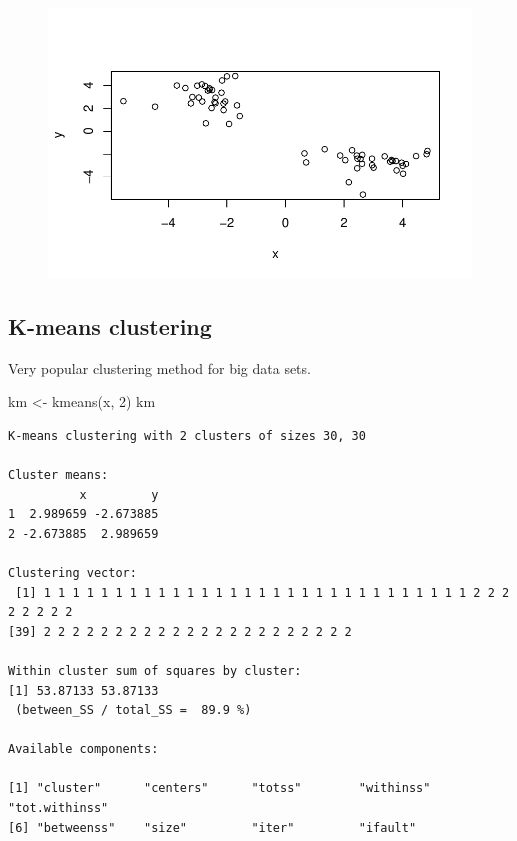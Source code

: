 \documentclass[
  letterpaper,
  DIV=11,
  numbers=noendperiod]{scrartcl}
\newenvironment{Shaded}{\begin{snugshade}}{\end{snugshade}}
\newcommand{\DecValTok}[1]{\textcolor[rgb]{0.68,0.00,0.00}{#1}}
\newcommand{\FunctionTok}[1]{\textcolor[rgb]{0.28,0.35,0.67}{#1}}
\newcommand{\NormalTok}[1]{\textcolor[rgb]{0.00,0.23,0.31}{#1}}
\newcommand{\OtherTok}[1]{\textcolor[rgb]{0.00,0.23,0.31}{#1}}
\begin{document}
\begin{figure}[H]

{\centering \includegraphics{Lab-7_files/figure-pdf/unnamed-chunk-4-1.pdf}

}

\end{figure}

\hypertarget{k-means-clustering}{%
\subsection{K-means clustering}\label{k-means-clustering}}

Very popular clustering method for big data sets.

\begin{Shaded}
\begin{Highlighting}[]
\NormalTok{km }\OtherTok{\textless{}{-}} \FunctionTok{kmeans}\NormalTok{(x, }\DecValTok{2}\NormalTok{)}
\NormalTok{km}
\end{Highlighting}
\end{Shaded}

\begin{verbatim}
K-means clustering with 2 clusters of sizes 30, 30

Cluster means:
          x         y
1  2.989659 -2.673885
2 -2.673885  2.989659

Clustering vector:
 [1] 1 1 1 1 1 1 1 1 1 1 1 1 1 1 1 1 1 1 1 1 1 1 1 1 1 1 1 1 1 1 2 2 2 2 2 2 2 2
[39] 2 2 2 2 2 2 2 2 2 2 2 2 2 2 2 2 2 2 2 2 2 2

Within cluster sum of squares by cluster:
[1] 53.87133 53.87133
 (between_SS / total_SS =  89.9 %)

Available components:

[1] "cluster"      "centers"      "totss"        "withinss"     "tot.withinss"
[6] "betweenss"    "size"         "iter"         "ifault"      
\end{verbatim}
\end{document}

